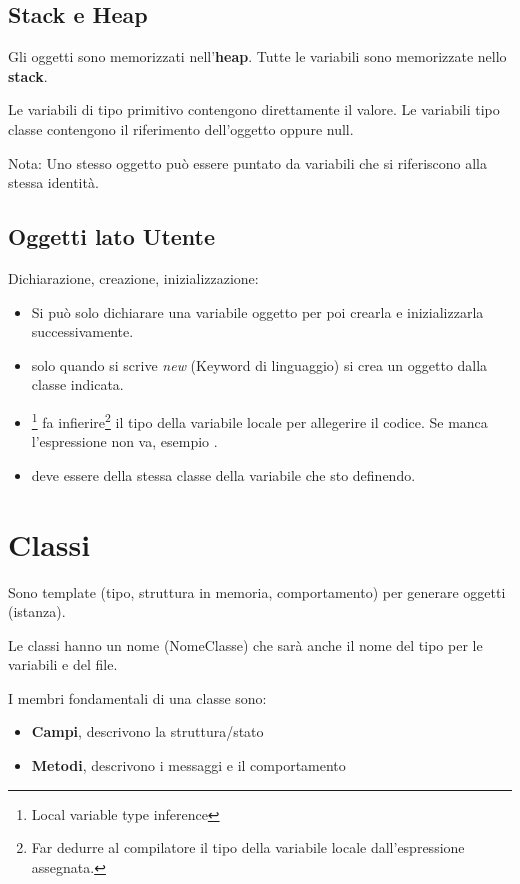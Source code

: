 \subsection{Stack e Heap}
Gli oggetti sono memorizzati nell'\textbf{heap}. Tutte le variabili sono memorizzate nello \textbf{stack}.

Le variabili di tipo primitivo contengono direttamente il valore. Le variabili tipo classe contengono il riferimento dell'oggetto oppure null.

Nota: Uno stesso oggetto può essere puntato da variabili che si riferiscono alla stessa identità.

\subsection{Oggetti lato Utente}
Dichiarazione, creazione, inizializzazione:

\begin{itemize}
	\item {} Si può solo dichiarare una variabile oggetto per poi crearla e inizializzarla successivamente.
	\item solo quando si scrive \textit{new} (Keyword di linguaggio) si crea un oggetto dalla classe indicata.
	\item {}\footnote{Local variable type inference} fa infierire\footnote{Far dedurre al compilatore il tipo della variabile locale dall'espressione assegnata.} il tipo della variabile locale per allegerire il codice. Se manca l'espressione non va, esempio .
	\item {} deve essere della stessa classe della variabile che sto definendo.
\end{itemize}







\section{Classi}
Sono template (tipo, struttura in memoria, comportamento) per generare oggetti (istanza).

Le classi hanno un nome (NomeClasse) che sarà anche il nome del tipo per le variabili e del file.

I membri fondamentali di una classe sono:
\begin{itemize}
	\item \textbf{Campi}, descrivono la struttura/stato
	\item \textbf{Metodi}, descrivono i messaggi e il comportamento
\end{itemize}

